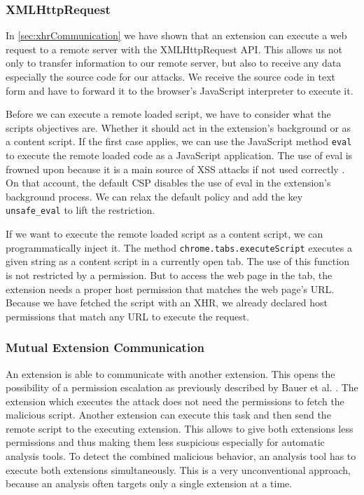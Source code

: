 \subsubsection{XMLHttpRequest}

	In \autoref{sec:xhrCommunication} we have shown that an extension can execute a web request to a remote server with the XMLHttpRequest API. This allows us not only to transfer information to our remote server, but also to receive any data especially the source code for our attacks. We receive the source code in text form and have to forward it to the browser's JavaScript interpreter to execute it.
	
	Before we can execute a remote loaded script, we have to consider what the scripts objectives are. Whether it should act in the extension's background or as a content script. If the first case applies, we can use the JavaScript method \texttt{eval} to execute the remote loaded code as a JavaScript application. The use of eval is frowned upon because it is a main source of XSS attacks if not used correctly \cite{mozillaDangerousEval}. On that account, the default CSP disables the use of eval in the extension's background process. We can relax the default policy and add the key \texttt{unsafe\_eval} to lift the restriction. 
	
	If we want to execute the remote loaded script as a content script, we can programmatically inject it. The method \texttt{chrome.tabs.executeScript} executes a given string as a content script in a currently open tab. The use of this function is not restricted by a permission. But to access the web page in the tab, the extension needs a proper host permission that matches the web page's URL. Because we have fetched the script with an XHR, we already declared host permissions that match any URL to execute the request.
	
\subsubsection{Mutual Extension Communication}

	An extension is able to communicate with another extension. This opens the possibility of a permission escalation as previously described by Bauer et al. \cite{extensions:cns14}. The extension which executes the attack does not need the permissions to fetch the malicious script. Another extension can execute this task and then send the remote script to the executing extension. This allows to give both extensions less permissions and thus making them less suspicious especially for automatic analysis tools. To detect the combined malicious behavior, an analysis tool has to execute both extensions simultaneously. This is a very unconventional approach, because an analysis often targets only a single extension at a time. 
	
